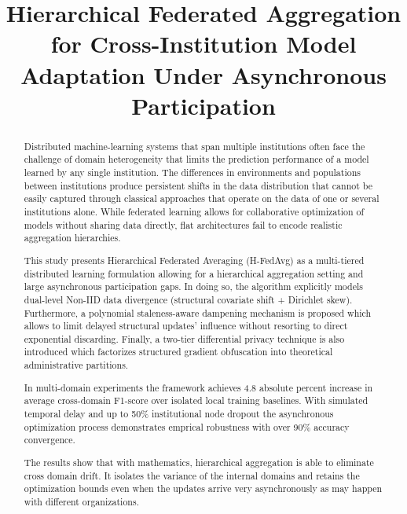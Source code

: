 \documentclass[conference]{IEEEtran}
\begin{document}
\title{Hierarchical Federated Aggregation for Cross-Institution Model Adaptation Under Asynchronous Participation}

\author{
}

\maketitle

\begin{abstract}
Distributed machine-learning systems that span multiple institutions often face the challenge of domain heterogeneity that limits the prediction performance of a model learned by any single institution. The differences in environments and populations between institutions produce persistent shifts in the data distribution that cannot be easily captured through classical approaches that operate on the data of one or several institutions alone. While federated learning allows for collaborative optimization of models without sharing data directly, flat architectures fail to encode realistic aggregation hierarchies.

This study presents Hierarchical Federated Averaging (H-FedAvg) as a multi-tiered distributed learning formulation allowing for a hierarchical aggregation setting and large asynchronous participation gaps. In doing so, the algorithm explicitly models dual-level Non-IID data divergence (structural covariate shift + Dirichlet skew). Furthermore, a polynomial staleness-aware dampening mechanism is proposed which allows to limit delayed structural updates’ influence without resorting to direct exponential discarding. Finally, a two-tier differential privacy technique is also introduced which factorizes structured gradient obfuscation into theoretical administrative partitions.

In multi-domain experiments the framework achieves 4.8 absolute percent increase in average cross-domain F1-score over isolated local training baselines. With simulated temporal delay and up to 50\% institutional node dropout the asynchronous optimization process demonstrates emprical robustness with over 90\% accuracy convergence.

The results show that with mathematics, hierarchical aggregation is able to eliminate cross domain drift. It isolates the variance of the internal domains and retains the optimization bounds even when the updates arrive very asynchronously as may happen with different organizations.
\end{abstract}
\end{document}
